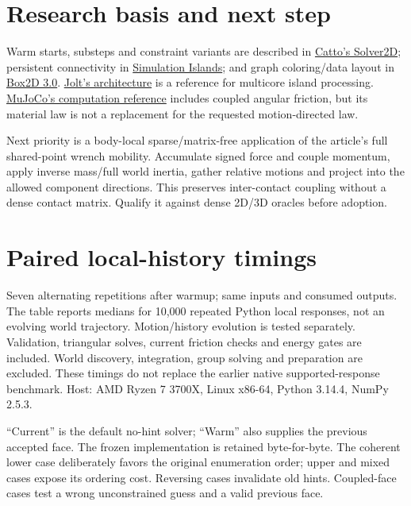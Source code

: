 \documentclass[10pt,a4paper]{article}
\begin{document}
\section*{Research basis and next step}
Warm starts, substeps and constraint variants are described in
\href{https://box2d.org/posts/2024/02/solver2d/}{Catto's Solver2D}; persistent
connectivity in \href{https://box2d.org/posts/2023/10/simulation-islands/}{Simulation
Islands}; and graph coloring/data layout in
\href{https://box2d.org/posts/2024/08/releasing-box2d-3.0/}{Box2D 3.0}.
\href{https://jrouwe.github.io/JoltPhysicsDocs/5.5.0/index.html}{Jolt's architecture}
is a reference for multicore island processing.
\href{https://mujoco.readthedocs.io/en/latest/computation.html}{MuJoCo's computation
reference} includes coupled angular friction, but its material law is not a
replacement for the requested motion-directed law.

Next priority is a body-local sparse/matrix-free application of the article's
full shared-point wrench mobility. Accumulate signed force and couple momentum,
apply inverse mass/full world inertia, gather relative motions and project into
the allowed component directions. This preserves inter-contact coupling without
a dense contact matrix. Qualify it against dense 2D/3D oracles before adoption.
\newpage
\section*{Paired local-history timings}
Seven alternating repetitions after warmup; same inputs and consumed outputs.
The table reports medians for 10,000 repeated Python local responses, not an
evolving world trajectory. Motion/history evolution is tested separately. Validation, triangular
solves, current friction checks and energy gates are included. World discovery,
integration, group solving and preparation are excluded. These timings do not
replace the earlier native supported-response benchmark. Host: AMD Ryzen 7
3700X, Linux x86-64, Python 3.14.4, NumPy 2.5.3.

``Current'' is the default no-hint solver; ``Warm'' also supplies the previous
accepted face. The frozen implementation is retained byte-for-byte. The coherent
lower case deliberately favors the original enumeration order; upper and mixed
cases expose its ordering cost. Reversing cases invalidate old hints. Coupled-face
cases test a wrong unconstrained guess and a valid previous face.
\end{document}
